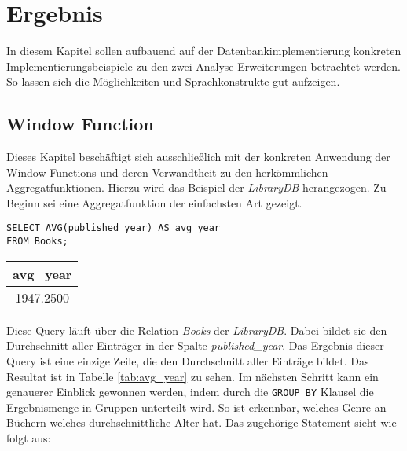 \chapter{Ergebnis}
\label{chap:ergebnis} In diesem Kapitel sollen aufbauend auf der Datenbankimplementierung
konkreten Implementierungsbeispiele zu den zwei Analyse-Erweiterungen betrachtet
werden. So lassen sich die Möglichkeiten und Sprachkonstrukte gut aufzeigen.

\section{Window Function}
\label{sec:window_function} Dieses Kapitel beschäftigt sich ausschließlich mit
der konkreten Anwendung der Window Functions und deren Verwandtheit zu den
herkömmlichen Aggregatfunktionen. Hierzu wird das Beispiel der \textit{LibraryDB}
herangezogen. Zu Beginn sei eine Aggregatfunktion der einfachsten Art gezeigt.

\begin{minipage}{0.68\textwidth}
	 \begin{lstlisting}
SELECT AVG(published_year) AS avg_year
FROM Books;
	\end{lstlisting}
\end{minipage}
\hfill
\begin{minipage}{0.28\textwidth}
	\centering
	\begin{tabular}{|c|}
		\hline
		\textbf{avg\_year} \\
		\hline
		1947.2500          \\
		\hline
	\end{tabular}
	 \label{tab:avg_year}
\end{minipage}

Diese Query läuft über die Relation \textit{Books} der \textit{LibraryDB}. Dabei
bildet sie den Durchschnitt aller Einträger in der Spalte \textit{published\_year}.
Das Ergebnis dieser Query ist eine einzige Zeile, die den Durchschnitt aller
Einträge bildet. Das Resultat ist in Tabelle \ref{tab:avg_year} zu sehen. Im
nächsten Schritt kann ein genauerer Einblick gewonnen werden, indem durch die \texttt{GROUP
BY} Klausel die Ergebnismenge in Gruppen unterteilt wird. So ist erkennbar,
welches Genre an Büchern welches durchschnittliche Alter hat. Das zugehörige Statement
sieht wie folgt aus:


